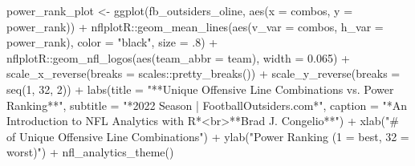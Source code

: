 \documentclass[
  letterpaper,
]{krantz}
\newenvironment{Shaded}{\begin{snugshade}}{\end{snugshade}}
\newcommand{\AttributeTok}[1]{\textcolor[rgb]{0.40,0.45,0.13}{#1}}
\newcommand{\DecValTok}[1]{\textcolor[rgb]{0.68,0.00,0.00}{#1}}
\newcommand{\FloatTok}[1]{\textcolor[rgb]{0.68,0.00,0.00}{#1}}
\newcommand{\FunctionTok}[1]{\textcolor[rgb]{0.28,0.35,0.67}{#1}}
\newcommand{\NormalTok}[1]{\textcolor[rgb]{0.00,0.23,0.31}{#1}}
\newcommand{\OtherTok}[1]{\textcolor[rgb]{0.00,0.23,0.31}{#1}}
\newcommand{\SpecialCharTok}[1]{\textcolor[rgb]{0.37,0.37,0.37}{#1}}
\newcommand{\StringTok}[1]{\textcolor[rgb]{0.13,0.47,0.30}{#1}}
\begin{document}
\begin{Shaded}
\begin{Highlighting}[]
\NormalTok{power\_rank\_plot }\OtherTok{\textless{}{-}} \FunctionTok{ggplot}\NormalTok{(fb\_outsiders\_oline, }\FunctionTok{aes}\NormalTok{(}\AttributeTok{x =}\NormalTok{ combos, }\AttributeTok{y =}\NormalTok{ power\_rank)) }\SpecialCharTok{+}
\NormalTok{  nflplotR}\SpecialCharTok{::}\FunctionTok{geom\_mean\_lines}\NormalTok{(}\FunctionTok{aes}\NormalTok{(}\AttributeTok{v\_var =}\NormalTok{ combos, }\AttributeTok{h\_var =}\NormalTok{ power\_rank),}
                            \AttributeTok{color =} \StringTok{"black"}\NormalTok{,}
                            \AttributeTok{size =}\NormalTok{ .}\DecValTok{8}\NormalTok{) }\SpecialCharTok{+}
\NormalTok{  nflplotR}\SpecialCharTok{::}\FunctionTok{geom\_nfl\_logos}\NormalTok{(}\FunctionTok{aes}\NormalTok{(}\AttributeTok{team\_abbr =}\NormalTok{ team), }\AttributeTok{width =} \FloatTok{0.065}\NormalTok{) }\SpecialCharTok{+}
  \FunctionTok{scale\_x\_reverse}\NormalTok{(}\AttributeTok{breaks =}\NormalTok{ scales}\SpecialCharTok{::}\FunctionTok{pretty\_breaks}\NormalTok{()) }\SpecialCharTok{+}
  \FunctionTok{scale\_y\_reverse}\NormalTok{(}\AttributeTok{breaks =} \FunctionTok{seq}\NormalTok{(}\DecValTok{1}\NormalTok{, }\DecValTok{32}\NormalTok{, }\DecValTok{2}\NormalTok{)) }\SpecialCharTok{+}
  \FunctionTok{labs}\NormalTok{(}\AttributeTok{title =} \StringTok{"**Unique Offensive Line Combinations vs. Power Ranking**"}\NormalTok{,}
       \AttributeTok{subtitle =} \StringTok{"*2022 Season  |  FootballOutsiders.com*"}\NormalTok{,}
       \AttributeTok{caption =} \StringTok{"*An Introduction to NFL Analytics with R*\textless{}br\textgreater{}**Brad J. Congelio**"}\NormalTok{) }\SpecialCharTok{+}
  \FunctionTok{xlab}\NormalTok{(}\StringTok{"\# of Unique Offensive Line Combinations"}\NormalTok{) }\SpecialCharTok{+}
  \FunctionTok{ylab}\NormalTok{(}\StringTok{"Power Ranking (1 = best, 32 = worst)"}\NormalTok{) }\SpecialCharTok{+}
  \FunctionTok{nfl\_analytics\_theme}\NormalTok{()}


\end{Highlighting}
\end{Shaded}
\end{document}

